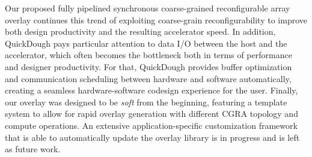 Our proposed fully pipelined synchronous coarse-grained reconfigurable array overlay continues this trend of exploiting coarse-grain reconfigurability to improve both design productivity and the resulting accelerator speed. 
In addition, QuickDough pays particular attention to data I/O between the host and the accelerator, which often becomes the bottleneck both in terms of performance and designer productivity.  For that, QuickDough provides buffer optimization and communication scheduling between hardware and software automatically, creating a seamless hardware-software codesign experience for the user.
Finally, our overlay was designed to be \emph{soft} from the beginning, featuring a template system to allow for rapid overlay generation with different CGRA topology and compute operations.  
An extensive application-specific customization framework that is able to automatically update the overlay library is in progress and is left as future work.



